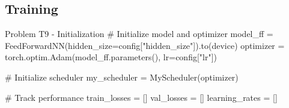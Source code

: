 \documentclass[12pt, a4paper]{article}
\begin{document}
    \pagebreak

            \subsection{Training}

                \begin{codeblock}{Problem T9 - Initialization}
                    # Initialize model and optimizer
                    model_ff = FeedForwardNN(hidden_size=config["hidden_size"]).to(device)
                    optimizer = torch.optim.Adam(model_ff.parameters(), lr=config["lr"])

                    # Initialize scheduler
                    my_scheduler = MyScheduler(optimizer)

                    # Track performance
                    train_losses = []
                    val_losses = []
                    learning_rates = []
                \end{codeblock}
\end{document}
